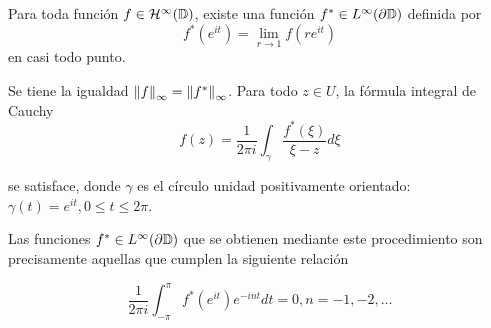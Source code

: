 \begin{theorem}
    Para toda función $f \in \mathcal{H}^{\infty}(\mathbb{D})$, existe una función $f^* \in L^{\infty} (\partial \mathbb{D})$ definida por
    \begin{equation}
        \label{fatou1}
        f^*(e^{it}) = \lim_{r \rightarrow 1} f(re^{it})
    \end{equation}
    en casi todo punto.

    Se tiene la igualdad $\left\lVert f\right\rVert_{\infty} = \left\lVert f^*\right\rVert_{\infty}$. Para todo $z \in U$, la fórmula integral de Cauchy
    \begin{equation}
        \label{fatou2}
        f(z) = \dfrac{1}{2 \pi i} \int_{\gamma} \dfrac{f^*(\xi)}{\xi - z} d\xi
    \end{equation}

    se satisface, donde $\gamma$ es el círculo unidad positivamente orientado: $\gamma(t) = e^{it}, 0 \leq t \leq 2 \pi$.

    Las funciones $f^* \in L^{\infty}(\partial \mathbb{D})$ que se obtienen mediante este procedimiento son precisamente aquellas que cumplen la siguiente relación

    \begin{equation}
        \label{fatou3}
        \dfrac{1}{2 \pi i} \int_{-\pi}^{\pi} f^*(e^{it})e^{-int} dt = 0, n = -1,-2, \dots
    \end{equation}
\end{theorem}

